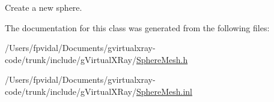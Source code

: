 Create a new sphere. 



The documentation for this class was generated from the following files:\begin{DoxyCompactItemize}
\item 
/Users/fpvidal/Documents/gvirtualxray-\/code/trunk/include/gVirtualXRay/\hyperlink{_sphere_mesh_8h}{SphereMesh.h}\item 
/Users/fpvidal/Documents/gvirtualxray-\/code/trunk/include/gVirtualXRay/\hyperlink{_sphere_mesh_8inl}{SphereMesh.inl}\end{DoxyCompactItemize}
